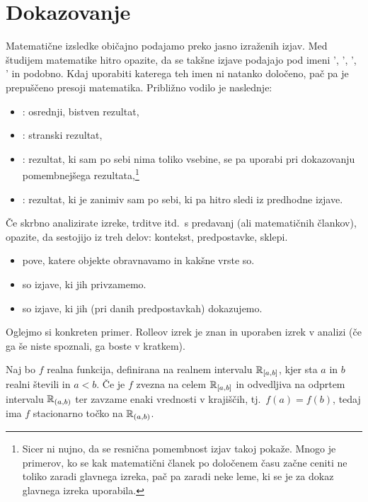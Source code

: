 \chapter{Dokazovanje}\label{POGLAVJE: Dokazovanje}

	Matematične izsledke običajno podajamo preko jasno izraženih izjav. Med študijem matematike hitro opazite, da se takšne izjave podajajo pod imeni ', ', ', ' in podobno. Kdaj uporabiti katerega teh imen ni natanko določeno, pač pa je prepuščeno presoji matematika. Približno vodilo je naslednje:
	\begin{itemize}
		\item
			: osrednji, bistven rezultat,
		\item
			: stranski rezultat,
		\item
			: rezultat, ki sam po sebi nima toliko vsebine, se pa uporabi pri dokazovanju pomembnejšega rezultata,\footnote{Sicer ni nujno, da se resnična pomembnost izjav takoj pokaže. Mnogo je primerov, ko se kak matematični članek po določenem času začne ceniti ne toliko zaradi glavnega izreka, pač pa zaradi neke leme, ki se je za dokaz glavnega izreka uporabila.}
		\item
			: rezultat, ki je zanimiv sam po sebi, ki pa hitro sledi iz predhodne izjave.
	\end{itemize}
	
	Če skrbno analizirate izreke, trditve itd.~s predavanj (ali matematičnih člankov), opazite, da sestojijo iz treh delov: kontekst, predpostavke, sklepi.
	\begin{itemize}
		\item
			 pove, katere objekte obravnavamo in kakšne vrste so.
		\item
			 so izjave, ki jih privzamemo.
		\item
			 so izjave, ki jih (pri danih predpostavkah) dokazujemo.
	\end{itemize}
	
	Oglejmo si konkreten primer. Rolleov izrek je znan in uporaben izrek v analizi (če ga še niste spoznali, ga boste v kratkem).
	
	\begin{izrek}[Rolle]
		Naj bo $f$ realna funkcija, definirana na realnem intervalu ${\mathbb{R}}_{[a, b]}$, kjer sta $a$ in $b$ realni števili in $a < b$. Če je $f$ zvezna na celem ${\mathbb{R}}_{[a, b]}$ in odvedljiva na odprtem intervalu ${\mathbb{R}}_{(a, b)}$ ter zavzame enaki vrednosti v krajiščih, tj.~$f(a) = f(b)$, tedaj ima $f$ stacionarno točko na ${\mathbb{R}}_{(a, b)}$.
	\end{izrek}
	
